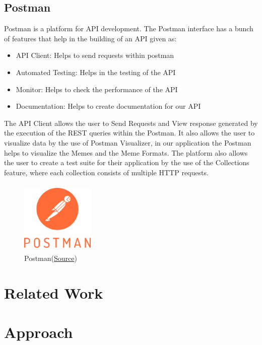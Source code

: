 \documentclass[12pt]{article}
\begin{document}
\subsection{Postman}
Postman is a platform for \ac{API} development. The Postman interface has a bunch of features that help in the building of an \ac{API} given as:
\begin{itemize}
    \item API Client: Helps to send requests within postman
    \item Automated Testing: Helps in the testing of the API
    \item Monitor: Helps to check the performance of the API
    \item Documentation: Helps to create documentation for our API
\end{itemize}
\begin{flushleft}
The \ac{API} Client allows the user to Send Requests and View response generated by the execution of the REST queries within the Postman. It also allows the user to visualize data by the use of Postman Visualizer, in our application the Postman helps to visualize the Memes and the Meme Formats. The platform also allows the user to create a test suite for their application by the use of the Collections feature, where each collection consists of multiple HTTP requests.
\end{flushleft}
\begin{figure}[H]
    \centering
    \includegraphics[width=3.5cm, height=3.5cm]{../report_MemeEcon/images/postman.png}
    \caption{Postman(\href{https://www.postman.com/resources/media-assets/}{Source})}
    \label{fig:Postman}
\end{figure}

\section{Related Work} \label{sec:RelatedWork} %

\section{Approach} \label{sec:Approach}
\end{document}
